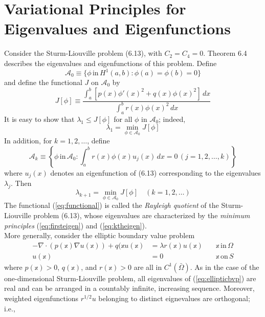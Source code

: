 \documentclass[11pt]{book}
\theoremstyle{example}
\theoremstyle{problem}
\theoremstyle{theorem}
\theoremstyle{definition}
\begin{document}
\section{Variational Principles for Eigenvalues and Eigenfunctions}
Consider the Sturm-Liouville problem (6.13), with $C_2=C_4=0$. Theorem 6.4 describes the eigenvalues and eigenfunctions of this problem. Define
\begin{equation}
	\mathscr{A}_0\equiv\{\phi\,\mathrm{in}\,H^1(a,b):\phi(a)=\phi(b)=0\}
\end{equation}
and define the functional $J$ on $\mathscr{A}_0$ by
\begin{equation}\label{eq:functional}
	J[\phi]\equiv\frac{\int_a^b{[p(x)\phi'(x)^2+q(x)\phi(x)^2]\,dx}}{\int_a^b{r(x)\phi(x)^2\,dx}}
\end{equation}
It is easy to show that $\lambda_1\leq{J[\phi]}$ for all $\phi$ in $\mathscr{A}_0$; indeed,
\begin{equation}\label{eq:firsteigen}
	\lambda_1=\min\limits_{\phi\in\mathscr{A}_0}J[\phi]
\end{equation}
In addition, for $k=1,2,\ldots$, define
\begin{equation}
	\mathscr{A}_k\equiv\left\{\phi\,\mathrm{in}\,\mathscr{A}_0:\int_a^b{r(x)\phi(x)u_j(x)\,dx=0}\,(j=1,2,\ldots,k)\right\}
\end{equation}
where $u_j(x)$ denotes an eigenfunction of (6.13) corresponding to the eigenvalues $\lambda_j$. Then
\begin{equation}\label{eq:ktheigen}
	\lambda_{k+1}=\min\limits_{\phi\in\mathscr{A}_0}J[\phi]\quad(k=1,2,\ldots)
\end{equation}
The functional (\ref{eq:functional}) is called the \emph{Rayleigh quotient} of the Sturm-Liouville problem (6.13), whose eigenvalues are characterized by the \emph{minimum principles} (\ref{eq:firsteigen}) and (\ref{eq:ktheigen}).\\
More generally, consider the elliptic boundary value problem
\begin{align}\label{eq:ellipticbvp}
	-\mathbb{\nabla}\cdot(p(\mathbb{x})\mathbb{\nabla}u(\mathbb{x}))+q(\mathbb{x}u(\mathbb{x})&={\lambda}r(\mathbb{x})u(\mathbb{x})&\quad\mathbb{x}\,\mathrm{in}\,\Omega\\
	u(\mathbb{x})&=0&\quad\mathbb{x}\,\mathrm{on}\,S
\end{align}
where $p(\mathbb{x})>0$, $q(\mathbb{x})$, and $r(\mathbb{x})>0$ are all in $C^1(\bar{\Omega})$. As in the case of the one-dimensional Sturm-Liouville problem, all eigenvalues of (\ref{eq:ellipticbvp}) are real and can be arranged in a countably infinite, increasing sequence. Moreover, weighted eigenfunctions $r^{1/2}u$ belonging to distinct eignevalues are orthogonal; i.e.,
\end{document}

